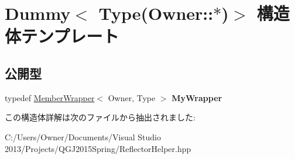\hypertarget{struct_dummy_3_01_type_07_owner_1_1_5_08_4}{}\section{Dummy$<$ Type(Owner\+:\+:$\ast$)$>$ 構造体テンプレート}
\label{struct_dummy_3_01_type_07_owner_1_1_5_08_4}
\subsection*{公開型}
\begin{DoxyCompactItemize}
\item 
typedef \hyperlink{class_member_wrapper}{Member\+Wrapper}$<$ Owner, Type $>$ {\bfseries My\+Wrapper}\hypertarget{struct_dummy_3_01_type_07_owner_1_1_5_08_4_afe0573ff734833ac8522ddf1d88a4183}{}\label{struct_dummy_3_01_type_07_owner_1_1_5_08_4_afe0573ff734833ac8522ddf1d88a4183}

\end{DoxyCompactItemize}


この構造体詳解は次のファイルから抽出されました\+:\begin{DoxyCompactItemize}
\item 
C\+:/\+Users/\+Owner/\+Documents/\+Visual Studio 2013/\+Projects/\+Q\+G\+J2015\+Spring/Reflector\+Helper.\+hpp\end{DoxyCompactItemize}
